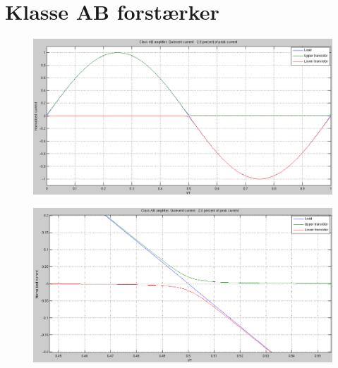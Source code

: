 



\chapter*{Klasse AB forstærker}

\begin{figure}[h]
\centering
\includegraphics[width=\textwidth]{klasse-ab.png}
\end{figure}

\begin{figure}[h]
\centering
\includegraphics[width=\textwidth]{klasse-ab-zoomed.png}
\end{figure}

